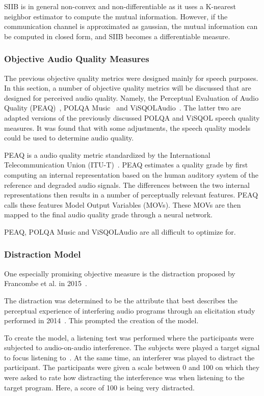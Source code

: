 SIIB is in general non-convex and non-differentiable as it uses a K-nearest neighbor estimator to compute the 
mutual information.
However, if the communication channel is approximated as gaussian, the mutual information can be computed in closed form,
and SIIB becomes a differentiable measure.

\subsubsection{Objective Audio Quality Measures}
The previous objective quality metrics were designed mainly for speech purposes.
In this section, a number of objective quality metrics will be discussed that are designed for perceived audio quality.
Namely, the Perceptual Evaluation of Audio Quality (PEAQ)~\cite{thiede2000peaq}, POLQA Music~\cite{povcta2015subjective} 
and ViSQOLAudio~\cite{hines2015visqolaudio}.
The latter two are adapted versions of the previously discussed POLQA and ViSQOL speech quality measures.
It was found that with some adjustments, the speech quality models could be used to determine audio quality.

PEAQ is a audio quality metric standardized by the International Telecommunication Union (ITU-T)~\cite{thiede2000peaq}.
PEAQ estimates a quality grade by first computing an internal representation based on the human auditory system of
the reference and degraded audio signals.
The differences between the two internal representations then results in a number of perceptually relevant features.
PEAQ calls these features Model Output Variables (MOVs).
These MOVs are then mapped to the final audio quality grade through a neural network.

PEAQ, POLQA Music and ViSQOLAudio are all difficult to optimize for.

\subsubsection{Distraction Model}
One especially promising objective measure is the distraction proposed by Francombe et al. in 2015~\cite{francombe2015model}.

The distraction was determined to be the attribute that best describes the perceptual experience of 
interfering audio programs through an elicitation study performed in 2014~\cite{francombe2014elicitation}.
This prompted the creation of the model.

To create the model, a listening test was performed where the participants were subjected to audio-on-audio interference.
The subjects were played a target signal to focus listening to~\cite{francombe2015model}.
At the same time, an interferer was played to distract the participant.
The participants were given a scale between 0 and 100 on which they were asked to rate how distracting the interference
was when listening to the target program.
Here, a score of 100 is being very distracted. 

